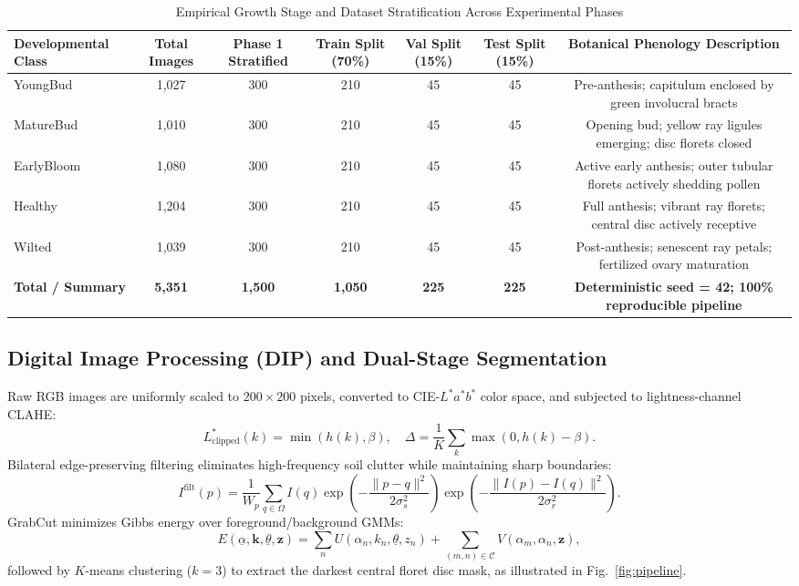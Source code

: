\documentclass{ieeeaccess}
\begin{document}
\begin{table}[t]
\caption{Empirical Growth Stage and Dataset Stratification Across Experimental Phases}
\label{tab:dataset_stratification}
\centering
\begin{tabular*}{\textwidth}{@{\extracolsep{\fill}}lcccccc@{}}
\toprule
\textbf{Developmental Class} & \textbf{Total Images} & \textbf{Phase 1 Stratified} & \textbf{Train Split (70\%)} & \textbf{Val Split (15\%)} & \textbf{Test Split (15\%)} & \textbf{Botanical Phenology Description} \\
\midrule
YoungBud   & 1,027 & 300 & 210 & 45 & 45 & Pre-anthesis; capitulum enclosed by green involucral bracts \\
MatureBud  & 1,010 & 300 & 210 & 45 & 45 & Opening bud; yellow ray ligules emerging; disc florets closed \\
EarlyBloom & 1,080 & 300 & 210 & 45 & 45 & Active early anthesis; outer tubular florets actively shedding pollen \\
Healthy    & 1,204 & 300 & 210 & 45 & 45 & Full anthesis; vibrant ray florets; central disc actively receptive \\
Wilted     & 1,039 & 300 & 210 & 45 & 45 & Post-anthesis; senescent ray petals; fertilized ovary maturation \\
\midrule
\textbf{Total / Summary} & \textbf{5,351} & \textbf{1,500} & \textbf{1,050} & \textbf{225} & \textbf{225} & \textbf{Deterministic seed = 42; 100\% reproducible pipeline} \\
\bottomrule
\end{tabular*}
\end{table}

\subsection{Digital Image Processing (DIP) and Dual-Stage Segmentation}
Raw RGB images are uniformly scaled to $200 \times 200$ pixels, converted to CIE-$L^*a^*b^*$ color space, and subjected to lightness-channel CLAHE:
\begin{equation}
L^*_{\text{clipped}}(k) = \min(h(k), \beta), \quad \Delta = \frac{1}{K}\sum_k \max(0, h(k) - \beta).
\end{equation}
Bilateral edge-preserving filtering eliminates high-frequency soil clutter while maintaining sharp boundaries:
\begin{equation}
I^{\text{filt}}(p) = \frac{1}{W_p} \sum_{q \in \Omega} I(q) \exp\left(-\frac{\|p - q\|^2}{2\sigma_s^2}\right) \exp\left(-\frac{\|I(p) - I(q)\|^2}{2\sigma_r^2}\right).
\end{equation}
GrabCut minimizes Gibbs energy over foreground/background GMMs:
\begin{equation}
E(\underline{\alpha}, \mathbf{k}, \underline{\theta}, \mathbf{z}) = \sum_n U(\alpha_n, k_n, \underline{\theta}, z_n) + \sum_{(m,n) \in \mathcal{C}} V(\alpha_m, \alpha_n, \mathbf{z}),
\end{equation}
followed by $K$-means clustering ($k=3$) to extract the darkest central floret disc mask, as illustrated in Fig.~\ref{fig:pipeline}.
\end{document}
